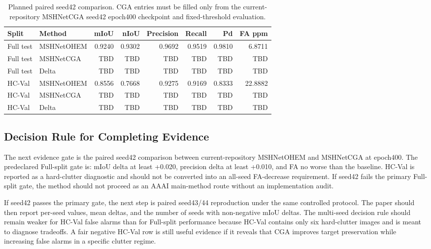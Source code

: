 \documentclass[letterpaper]{article}
\begin{document}
\begin{table}[t]
\centering
\caption{Planned paired seed42 comparison. CGA entries must be filled only from the current-repository MSHNetCGA seed42 epoch400 checkpoint and fixed-threshold evaluation.}
\label{tab:paired-main}
\small
\begin{tabular}{llrrrrrr}
\toprule
Split & Method & mIoU & nIoU & Precision & Recall & Pd & FA ppm \\
\midrule
Full test & MSHNetOHEM & 0.9240 & 0.9302 & 0.9692 & 0.9519 & 0.9810 & 6.8711 \\
Full test & MSHNetCGA & TBD & TBD & TBD & TBD & TBD & TBD \\
Full test & Delta & TBD & TBD & TBD & TBD & TBD & TBD \\
\midrule
HC-Val & MSHNetOHEM & 0.8556 & 0.7668 & 0.9275 & 0.9169 & 0.8333 & 22.8882 \\
HC-Val & MSHNetCGA & TBD & TBD & TBD & TBD & TBD & TBD \\
HC-Val & Delta & TBD & TBD & TBD & TBD & TBD & TBD \\
\bottomrule
\end{tabular}
\end{table}

\subsection{Decision Rule for Completing Evidence}

The next evidence gate is the paired seed42 comparison between current-repository MSHNetOHEM and MSHNetCGA at epoch400. The predeclared Full-split gate is: mIoU delta at least +0.020, precision delta at least +0.010, and FA no worse than the baseline. HC-Val is reported as a hard-clutter diagnostic and should not be converted into an all-seed FA-decrease requirement. If seed42 fails the primary Full-split gate, the method should not proceed as an AAAI main-method route without an implementation audit.

If seed42 passes the primary gate, the next step is paired seed43/44 reproduction under the same controlled protocol. The paper should then report per-seed values, mean deltas, and the number of seeds with non-negative mIoU deltas. The multi-seed decision rule should remain weaker for HC-Val false alarms than for Full-split performance because HC-Val contains only six hard-clutter images and is meant to diagnose tradeoffs. A fair negative HC-Val row is still useful evidence if it reveals that CGA improves target preservation while increasing false alarms in a specific clutter regime.
\end{document}
